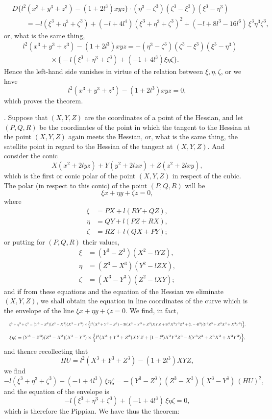 \documentclass[11pt]{article}
\begin{document}
\begin{align*}
&D\bigl\{l^2 (x^3 + y^3 + z^3) - (1 + 2 l^3) x y z\bigr\} \cdot (\eta^3 - \zeta^3)(\zeta^3 - \xi^3)(\xi^3 - \eta^3) \\
&\qquad = -l(\xi^3 + \eta^3 + \zeta^3) + (-l + 4 l^4)(\xi^3 + \eta^3 + \zeta^3)^2 + (-l + 8 l^3 - 16 l^6)\,\xi^3 \eta^3 \zeta^3,
\end{align*}
or, what is the same thing,
\begin{align*}
&l^2 (x^3 + y^3 + z^3) - (1 + 2 l^3) x y z = -(\eta^3 - \zeta^3)(\zeta^3 - \xi^3)(\xi^3 - \eta^3) \\
&\qquad\qquad\times \bigl\{-l(\xi^3 + \eta^3 + \zeta^3) + (-1 + 4 l^3)\xi\eta\zeta\bigr\}.
\end{align*}
Hence the left-hand side vanishes in virtue of the relation between $\xi, \eta, \zeta$, or we have
\[
l^2 (x^3 + y^3 + z^3) - (1 + 2 l^3) x y z = 0,
\]
which proves the theorem.

\medskip

. Suppose that $(X, Y, Z)$ are the coordinates of a point of the Hessian, and let $(P, Q, R)$ be the coordinates of the point in which the tangent to the Hessian at the point $(X, Y, Z)$ again meets the Hessian, or, what is the same thing, the satellite point in regard to the Hessian of the tangent at $(X, Y, Z)$. And consider the conic
\[
X(x^2 + 2 l y z) + Y(y^2 + 2 l z x) + Z(z^2 + 2 l x y),
\]
which is the first or conic polar of the point $(X, Y, Z)$ in respect of the cubic. The polar (in respect to this conic) of the point $(P, Q, R)$ will be
\[
\xi x + \eta y + \zeta z = 0,
\]
where
\begin{align*}
\xi &= P X + l(R Y + Q Z), \\
\eta &= Q Y + l(P Z + R X), \\
\zeta &= R Z + l(Q X + P Y);
\end{align*}
or putting for $(P, Q, R)$ their values,
\begin{align*}
\xi &= (Y^3 - Z^3)(X^2 - l Y Z), \\
\eta &= (Z^3 - X^3)(Y^2 - l Z X), \\
\zeta &= (X^3 - Y^3)(Z^2 - l X Y);
\end{align*}
and if from these equations and the equation of the Hessian we eliminate $(X, Y, Z)$, we shall obtain the equation in line coordinates of the curve which is the envelope of the line $\xi x + \eta y + \zeta z = 0$. We find, in fact,
\[
\resizebox{\textwidth}{!}{$\displaystyle \xi^3 + \eta^3 + \zeta^3 = (Y^3 - Z^3)(Z^3 - X^3)(X^3 - Y^3) \times \Bigl\{ l^2 (X^3 + Y^3 + Z^3) - 3 l (X^3 + Y^3 + Z^3) X Y Z + 9 l^2 X^3 Y^3 Z^3 + (1 - 4 l^3)(Y^3 Z^3 + Z^3 X^3 + X^3 Y^3) \Bigr\},$}
\]
\[
\resizebox{\textwidth}{!}{$\displaystyle \xi\eta\zeta = (Y^3 - Z^3)(Z^3 - X^3)(X^3 - Y^3) \times \Bigl\{ l^3 (X^3 + Y^3 + Z^3) X Y Z + (1 - l^3) X^3 Y^3 Z^3 - l(Y^3 Z^3 + Z^3 X^3 + X^3 Y^3) \Bigr\},$}
\]
and thence recollecting that
\[
HU = l^2 (X^3 + Y^3 + Z^3) - (1 + 2 l^3) X Y Z,
\]
we find
\[
-l(\xi^3 + \eta^3 + \zeta^3) + (-1 + 4 l^3)\,\xi\eta\zeta = -(Y^3 - Z^3)(Z^3 - X^3)(X^3 - Y^3)\,(HU)^2,
\]
and the equation of the envelope is
\[
-l(\xi^3 + \eta^3 + \zeta^3) + (-1 + 4 l^3)\,\xi\eta\zeta = 0,
\]
which is therefore the Pippian. We have thus the theorem:
\end{document}
